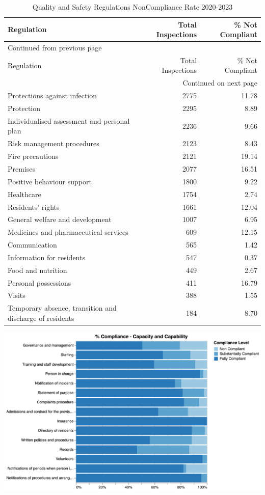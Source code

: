 \documentclass[a4paper,11pt,twoside]{article}
\begin{document}
\begin{longtable}{lrr}
\caption{Quality and Safety Regulations NonCompliance Rate 2020-2023}
\\[0pt]
Regulation & Total Inspections & \% Not Compliant\\[0pt]
\hline
\endfirsthead
\multicolumn{3}{l}{Continued from previous page} \\[0pt]
\hline

Regulation & Total Inspections & \% Not Compliant \\[0pt]

\hline
\endhead
\hline\multicolumn{3}{r}{Continued on next page} \\
\endfoot
\endlastfoot
\hline
Protections against infection & 2775 & 11.78\\[0pt]
Protection & 2295 & 8.89\\[0pt]
Individualised assessment and personal plan & 2236 & 9.66\\[0pt]
Risk management procedures & 2123 & 8.43\\[0pt]
Fire precautions & 2121 & 19.14\\[0pt]
Premises & 2077 & 16.51\\[0pt]
Positive behaviour support & 1800 & 9.22\\[0pt]
Healthcare & 1754 & 2.74\\[0pt]
Residents' rights & 1661 & 12.04\\[0pt]
General welfare and development & 1007 & 6.95\\[0pt]
Medicines and pharmaceutical services & 609 & 12.15\\[0pt]
Communication & 565 & 1.42\\[0pt]
Information for residents & 547 & 0.37\\[0pt]
Food and nutrition & 449 & 2.67\\[0pt]
Personal possessions & 411 & 16.79\\[0pt]
Visits & 388 & 1.55\\[0pt]
Temporary absence, transition and discharge of residents & 184 & 8.70\\[0pt]
\end{longtable}

\clearpage

\begin{center}
\includegraphics[width=.9\linewidth]{img/08_compliance_capacity.png}
\end{center}
\end{document}
